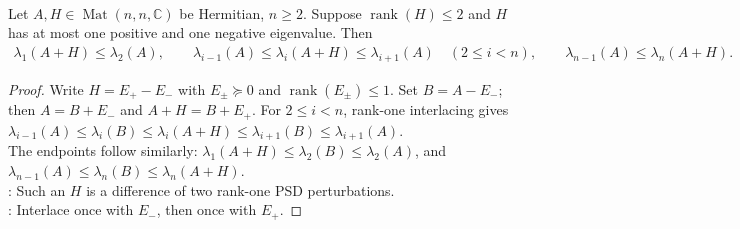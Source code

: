 \begin{corollary} \label{cor:rank-two-one-positive-one-negative-interlacing} \\
Let $A,H\in\operatorname{Mat}(n,n,\mathbb{C})$ be Hermitian, $n\geq2$. Suppose $\operatorname{rank}(H)\leq2$ and $H$ has at most one positive and one negative eigenvalue. Then
\begin{align}
\lambda_1(A+H)\leq\lambda_2(A),\qquad
\lambda_{i-1}(A)\leq\lambda_i(A+H)\leq\lambda_{i+1}(A)\quad(2\leq i<n),
\qquad
\lambda_{n-1}(A)\leq\lambda_n(A+H).
\nonumber
\end{align}
\begin{proof}
Write $H=E_+-E_-$ with $E_\pm\succeq0$ and $\operatorname{rank}(E_\pm)\leq1$. Set $B=A-E_-$; then $A=B+E_-$ and $A+H=B+E_+$. For $2\leq i<n$, rank-one interlacing gives $\lambda_{i-1}(A)\leq\lambda_i(B)\leq\lambda_i(A+H)\leq\lambda_{i+1}(B)\leq\lambda_{i+1}(A)$.\\
The endpoints follow similarly: $\lambda_1(A+H)\leq\lambda_2(B)\leq\lambda_2(A)$, and $\lambda_{n-1}(A)\leq\lambda_n(B)\leq\lambda_n(A+H)$.\\
: Such an $H$ is a difference of two rank-one PSD perturbations.\\
: Interlace once with $E_-$, then once with $E_+$.
\end{proof}
\end{corollary}

